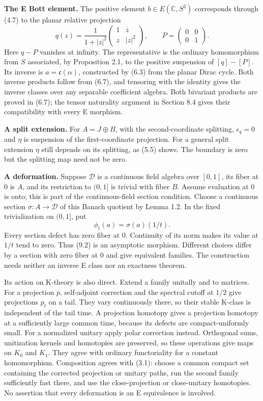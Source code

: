 \documentclass[
  11pt,
]{article}
\begin{document}
\textbf{The E Bott element.} The positive element
\(b\in E(\mathbb C,S^2)\) corresponds through (4.7) to the planar
relative projection \[
q(z)=\frac1{1+|z|^2}
\begin{pmatrix}1&\overline z\\z&|z|^2\end{pmatrix},
\qquad P=\begin{pmatrix}0&0\\0&1\end{pmatrix}.
\tag{9.1}
\] Here \(q-P\) vanishes at infinity. The representative is the ordinary
homomorphism from \(S\) associated, by Proposition 2.1, to the positive
suspension of \([q]-[P]\). Its inverse is \(a=\mathfrak c(\alpha)\),
constructed by (6.3) from the planar Dirac cycle. Both inverse products
follow from (6.7), and tensoring with the identity gives the inverse
classes over any separable coefficient algebra. Both bivariant products
are proved in (6.7); the tensor naturality argument in Section 8.4 gives
their compatibility with every E morphism.

\textbf{A split extension.} For \(A=J\oplus B\), with the
second-coordinate splitting, \(\epsilon_q=0\) and \(\eta\) is suspension
of the first-coordinate projection. For a general split extension
\(\eta\) still depends on its splitting, as (5.5) shows. The boundary is
zero but the splitting map need not be zero.

\textbf{A deformation.} Suppose \(\mathcal D\) is a continuous field
algebra over \([0,1]\), its fiber at 0 is \(A\), and its restriction to
\((0,1]\) is trivial with fiber \(B\). Assume evaluation at 0 is onto;
this is part of the continuous-field section condition. Choose a
continuous section \(\sigma:A\to\mathcal D\) of this Banach quotient by
Lemma 1.2. In the fixed trivialization on \((0,1]\), put \[
\phi_t(a)=\sigma(a)(1/t).
\tag{9.2}
\] Every section defect has zero fiber at 0. Continuity of its norm
makes its value at \(1/t\) tend to zero. Thus (9.2) is an asymptotic
morphism. Different choices differ by a section with zero fiber at 0 and
give equivalent families. The construction needs neither an inverse E
class nor an exactness theorem.

Its action on K-theory is also direct. Extend a family unitally and to
matrices. For a projection \(p\), self-adjoint correction and the
spectral cutoff at \(1/2\) give projections \(p_t\) on a tail. They vary
continuously there, so their stable K-class is independent of the tail
time. A projection homotopy gives a projection homotopy at a
sufficiently large common time, because its defects are
compact-uniformly small. For a normalized unitary apply polar correction
instead. Orthogonal sums, unitization kernels and homotopies are
preserved, so these operations give maps on \(K_0\) and \(K_1\). They
agree with ordinary functoriality for a constant homomorphism.
Composition agrees with (3.1): choose a common compact set containing
the corrected projection or unitary paths, run the second family
sufficiently fast there, and use the close-projection or close-unitary
homotopies. No assertion that every deformation is an E equivalence is
involved.
\end{document}
